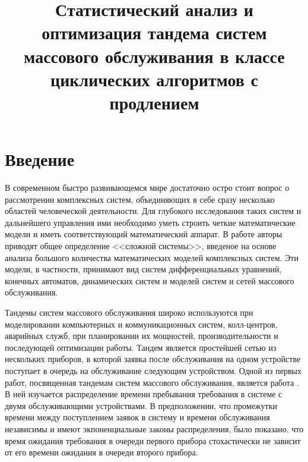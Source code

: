 \documentclass[11pt]{ubs}
\title{Статистический анализ и оптимизация тандема систем массового обслуживания в классе циклических алгоритмов  с продлением }%
\begin{document}
\maketitle

\section{Введение}

В современном быстро развивающемся мире достаточно остро стоит вопрос о рассмотрении комплексных систем, объединяющих в себе сразу несколько областей человеческой деятельности. Для глубокого исследования таких систем и дальнейшего управления ими необходимо уметь строить четкие математические модели и иметь соответствующий математический аппарат. В работе \cite{Buslenko} авторы приводят общее определение <<сложной системы>>, введеное на основе анализа большого количества математических моделей комплексных систем. Эти модели, в частности, принимают вид систем дифференциальных уравнений, конечных автоматов, динамических систем и моделей систем и сетей массового обслуживания.

Тандемы систем массового обслуживания широко используются при моделировании компьютерных и коммуникационных систем, колл-центров, аварийных служб, при планировании их мощностей, производительности и последующей оптимизации работы. 
Тандем является простейшей сетью из нескольких приборов, в которой заявка после обслуживания на одном устройстве  поступает в очередь на обслуживание следующим устройством.
Одной из первых работ, посвященная тандемам систем массового обслуживания, является работа \cite{Reich:1957}. В ней изучается распределение времени пребывания требования в системе с двумя обслуживающими устройствами. В предположении, что промежутки времени между поступлением заявок в систему и времени обслуживания независимы и имеют экпоненциальные законы распределения, было показано, что время ожидания требования в очереди первого прибора стохастически не зависит от его времени ожидания в очереди второго прибора. 
\end{document}
